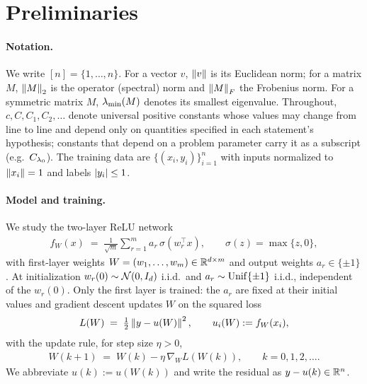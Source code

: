 \section{Preliminaries}\label{sec:prelim}

\paragraph{Notation.}
We write $[n]=\{1,\dots,n\}$. For a vector $v$, $\left\| v \right\|$ is its Euclidean norm;
for a matrix $M$, $\left\| M \right\|_{2}$ is the operator (spectral) norm and $\left\| M \right\|_{F}$ the
Frobenius norm. For a symmetric matrix $M$, $\lambda_{\min}(M)$ denotes its smallest eigenvalue.
Throughout, $c, C, C_1, C_2, \ldots$ denote universal positive constants whose values may
change from line to line and depend only on quantities specified in each statement's
hypothesis; constants that depend on a problem parameter carry it as a subscript
(e.g.\ $C_{\lambda_{0}}$). The training data are $\{(x_i, y_i)\}_{i=1}^n$ with inputs normalized
to $\left\| x_i \right\| = 1$ and labels $\left| y_i \right| \le 1$.

\paragraph{Model and training.}
We study the two-layer ReLU network
\begin{align}\label{eq:network}
f_{W}(x) \;=\; \frac{1}{\sqrt{m}} \sum_{r=1}^{m} a_r \, \sigma\!\left( w_r^{\top} x \right),
\qquad \sigma(z) = \max\{z, 0\},
\end{align}
with first-layer weights $W = (w_1, \dots, w_m) \in \mathbb{R}^{d \times m}$ and output weights
$a_r \in \{\pm 1\}$. At initialization $w_r(0) \sim \mathcal{N}(0, I_d)$ i.i.d.\ and
$a_r \sim \mathrm{Unif}\{\pm 1\}$ i.i.d., independent of the $w_r(0)$. Only the first layer is
trained: the $a_r$ are fixed at their initial values and gradient descent updates $W$ on the
squared loss
\begin{align}\label{eq:loss}
L(W) \;=\; \tfrac{1}{2} \left\| y - u(W) \right\|^2,
\qquad u_i(W) := f_{W}(x_i),
\end{align}
with the update rule, for step size $\eta > 0$,
\begin{align}\label{eq:gd}
W(k+1) \;=\; W(k) - \eta \, \nabla_{W} L\!\left( W(k) \right),
\qquad k = 0, 1, 2, \ldots.
\end{align}
We abbreviate $u(k) := u(W(k))$ and write the residual as $y - u(k) \in \mathbb{R}^n$.

